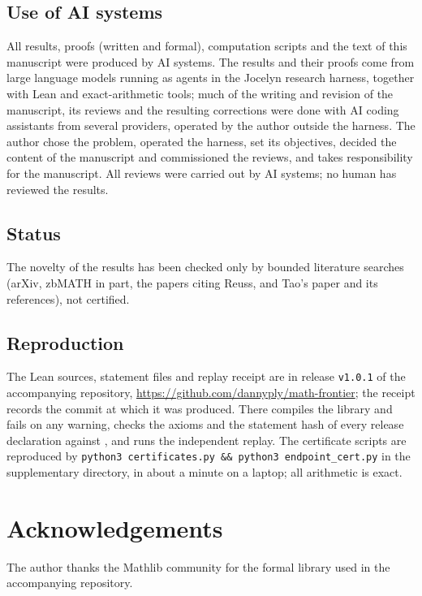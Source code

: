 \documentclass[11pt,reqno]{amsart}
\theoremstyle{definition}
\theoremstyle{remark}
\numberwithin{equation}{section}
\begin{document}
\subsection*{Use of AI systems}
All results, proofs (written and formal), computation scripts and the text of
this manuscript were produced by AI systems. The results and their proofs come
from large language models running as agents in the Jocelyn research harness,
together with Lean and exact-arithmetic tools; much of the writing and revision
of the manuscript, its reviews and the resulting corrections were done with AI
coding assistants from several providers, operated by the author outside the
harness. The author chose the problem, operated the harness, set its
objectives, decided the content of the manuscript and commissioned the
reviews, and takes responsibility for the manuscript. All reviews were carried
out by AI systems; no human has reviewed the results.

\subsection*{Status}
The novelty of the results has been checked only by bounded literature
searches (arXiv, zbMATH in part, the papers citing Reuss, and Tao's paper and
its references), not certified.

\subsection*{Reproduction}
The Lean sources, statement files and replay receipt are in release
\texttt{v1.0.1} of the accompanying repository,
\url{https://github.com/dannyply/math-frontier}; the receipt
 records the commit at which it
was produced. There  compiles
the library and fails on any warning,  checks the axioms
and the statement hash of every release declaration against
, and  runs the
independent replay. The certificate scripts are reproduced by
\texttt{python3 certificates.py \&\& python3 endpoint\_cert.py} in the
supplementary directory, in about a minute on a laptop; all arithmetic is
exact.

\section*{Acknowledgements}
The author thanks the Mathlib community for the formal library used in the
accompanying repository.
\end{document}
